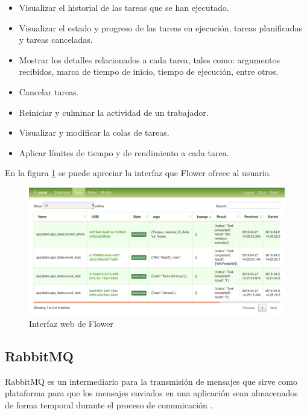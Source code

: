 \begin{itemize}

\item Visualizar el historial de las tareas que se han ejecutado.

\item Visualizar el estado y progreso de las tareas en ejecución, tareas planificadas y tareas canceladas.

\item Mostrar los detalles relacionados a cada tarea, tales como: argumentos recibidos, marca de tiempo de inicio, tiempo de ejecución, entre otros.

\item Cancelar tareas.

\item Reiniciar y culminar la actividad de un trabajador.

\item Visualizar y modificar la colas de tareas.

\item Aplicar límites de tiempo y de rendimiento a cada tarea.

\end{itemize}

En la figura \ref{fig:flower} se puede apreciar la interfaz que Flower ofrece al usuario.

\begin{figure}[H]
	\centering
		\includegraphics[width=1\textwidth]{figures/flower}
	\caption{Interfaz web de Flower}
	\label{fig:flower}
\end{figure}



\subsection{RabbitMQ}

RabbitMQ es un intermediario para la transmisión de mensajes que sirve como plataforma para que los mensajes enviados
en una aplicación sean almacenados de forma temporal durante el proceso de comunicación \cite{14}.

